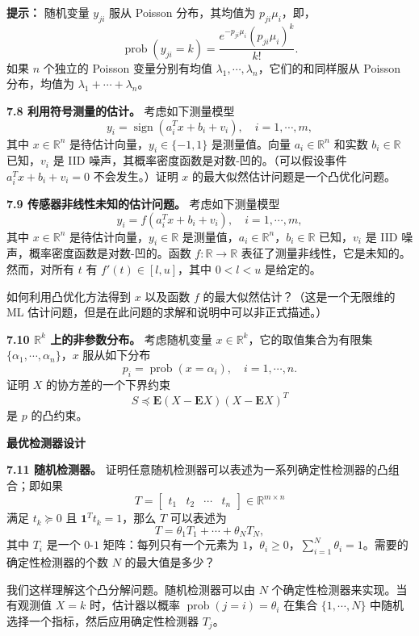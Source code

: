 \documentclass[UTF8, 12pt, fontset=fandol, oneside]{ctexart}
\begin{document}
\noindent\textbf{提示：}\quad
随机变量 $y_{ji}$ 服从 Poisson 分布，其均值为 $p_{ji}\mu_i$，即，
\[
\operatorname{prob}(y_{ji}=k)=\frac{e^{-p_{ji}\mu_i}(p_{ji}\mu_i)^k}{k!}.
\]
如果 $n$ 个独立的 Poisson 变量分别有均值 $\lambda_1,\cdots,\lambda_n$，它们的和同样服从 Poisson 分布，均值为 $\lambda_1+\cdots+\lambda_n$。

\noindent\textbf{7.8 利用符号测量的估计。}\quad
考虑如下测量模型
\[
y_i=\operatorname{sign}(a_i^Tx+b_i+v_i),\quad i=1,\cdots,m,
\]
其中 $x\in\mathbb{R}^n$ 是待估计向量，$y_i\in\{-1,1\}$ 是测量值。向量 $a_i\in\mathbb{R}^n$ 和实数 $b_i\in\mathbb{R}$ 已知，$v_i$ 是 IID 噪声，其概率密度函数是对数-凹的。（可以假设事件 $a_i^Tx+b_i+v_i=0$ 不会发生。）证明 $x$ 的最大似然估计问题是一个凸优化问题。

\noindent\textbf{7.9 传感器非线性未知的估计问题。}\quad
考虑如下测量模型
\[
y_i=f(a_i^Tx+b_i+v_i),\quad i=1,\cdots,m,
\]
其中 $x\in\mathbb{R}^n$ 是待估计向量，$y_i\in\mathbb{R}$ 是测量值，$a_i\in\mathbb{R}^n$，$b_i\in\mathbb{R}$ 已知，$v_i$ 是 IID 噪声，概率密度函数是对数-凹的。函数 $f:\mathbb{R}\to\mathbb{R}$ 表征了测量非线性，它是未知的。然而，对所有 $t$ 有 $f'(t)\in[l,u]$，其中 $0<l<u$ 是给定的。

如何利用凸优化方法得到 $x$ 以及函数 $f$ 的最大似然估计？（这是一个无限维的 ML 估计问题，但是在此问题的求解和说明中可以非正式描述。）

\noindent\textbf{7.10 $\mathbb{R}^k$ 上的非参数分布。}\quad
考虑随机变量 $x\in\mathbb{R}^k$，它的取值集合为有限集 $\{\alpha_1,\cdots,\alpha_n\}$，$x$ 服从如下分布
\[
p_i=\operatorname{prob}(x=\alpha_i),\quad i=1,\cdots,n.
\]
证明 $X$ 的协方差的一个下界约束
\[
S\preceq \mathbf{E}(X-\mathbf{E}X)(X-\mathbf{E}X)^T
\]
是 $p$ 的凸约束。

\noindent\textbf{最优检测器设计}

\noindent\textbf{7.11 随机检测器。}\quad
证明任意随机检测器可以表述为一系列确定性检测器的凸组合；即如果
\[
T=\begin{bmatrix}t_1&t_2&\cdots&t_n\end{bmatrix}\in\mathbb{R}^{m\times n}
\]
满足 $t_k\succeq 0$ 且 $\mathbf{1}^Tt_k=1$，那么 $T$ 可以表述为
\[
T=\theta_1T_1+\cdots+\theta_NT_N,
\]
其中 $T_i$ 是一个 $0$-$1$ 矩阵：每列只有一个元素为 $1$，$\theta_i\geq 0$，$\sum_{i=1}^N\theta_i=1$。需要的确定性检测器的个数 $N$ 的最大值是多少？

我们这样理解这个凸分解问题。随机检测器可以由 $N$ 个确定性检测器来实现。当有观测值 $X=k$ 时，估计器以概率 $\operatorname{prob}(j=i)=\theta_i$ 在集合 $\{1,\cdots,N\}$ 中随机选择一个指标，然后应用确定性检测器 $T_j$。
\end{document}
